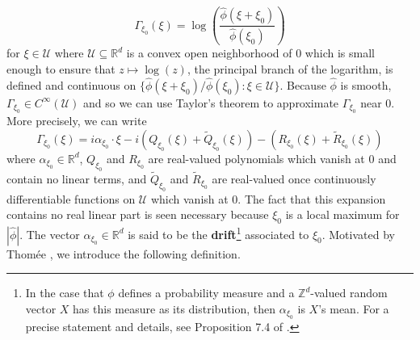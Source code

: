 \documentclass[smallextended]{svjour3}
\theoremstyle{remark}
\begin{document}
\begin{equation*}\Gamma_{\xi_0}(\xi)=\log\left(\frac{\widehat{\phi}(\xi+\xi_0)}{\widehat{\phi}(\xi_0)}\right)
\end{equation*}
for $\xi\in \mathcal{U}$ where $\mathcal{U}\subseteq\mathbb{R}^d$ is a convex open neighborhood of $0$ which is small enough to ensure that $z\mapsto\log(z)$, the principal branch of the logarithm, is defined and continuous on $\{\widehat{\phi}(\xi+\xi_0)/\widehat{\phi}(\xi_0):\xi\in\mathcal{U}\}$. Because $\widehat{\phi}$ is smooth, $\Gamma_{\xi_0}\in C^{\infty}(\mathcal{U})$ and so we can use Taylor's theorem to approximate $\Gamma_{\xi_0}$ near $0$. More precisely, we can write
\begin{equation}\label{eq:GammaExpansion}
    \Gamma_{\xi_0}(\xi)=i\alpha_{\xi_0}\cdot\xi -i\left(Q_{\xi_0}(\xi)+\widetilde{Q}_{\xi_0}(\xi)\right)-\left(R_{\xi_0}(\xi)+\widetilde{R}_{\xi_0}(\xi)\right)
\end{equation}
where $\alpha_{\xi_0}\in\mathbb{R}^d$, $Q_{\xi_0}$ and $R_{\xi_0}$ are real-valued polynomials which vanish at $0$ and contain no linear terms, and $\widetilde{Q}_{\xi_0}$ and $\widetilde{R}_{\xi_0}$ are real-valued once continuously differentiable functions on $\mathcal{U}$ which vanish at $0$. The fact that this expansion contains no real linear part is seen necessary because $\xi_0$ is a local maximum for $|\widehat{\phi}|$. The vector $\alpha_{\xi_0}\in\mathbb{R}^d$ is said to be the \textbf{drift}\footnote{In the case that $\phi$ defines a probability measure and a $\mathbb{Z}^d$-valued random vector $X$ has this measure as its distribution, then $\alpha_{\xi_0}$ is $X$'s mean. For a precise statement and details, see Proposition 7.4 of \cite{randles_convolution_2017}.} associated to $\xi_0$. Motivated by Thom\'{e}e \cite{thomee_stability_1965}, we introduce the following definition. 
\end{document}
